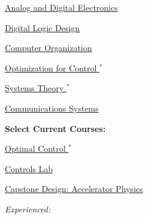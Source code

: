 \documentclass[10pt,a4paper,ragged2e,withhyper]{altacv}
\begin{document}
\begin{paracol}{2}
\begin{multicols}{2}
    \columnbreak
    
    \vspace{0.75cm}
    
    \begin{tightemize}
        \item \href{https://ece.umd.edu/course-schedule/course/ENEE303}{Analog and Digital Electronics}
        \item \href{https://ece.umd.edu/course-schedule/course/ENEE244}{Digital Logic Design}
        \item \href{https://ece.umd.edu/course-schedule/course/ENEE350}{Computer Organization}
        \item \href{https://ece.umd.edu/course-schedule/course/ENEE469O}{Optimization for Control $^*$}
        \item \href{https://ece.umd.edu/course-schedule/course/ENEE660}{Systems Theory $^*$}
        \item \href{https://ece.umd.edu/course-schedule/course/ENEE420}{Communications Systems}
    \end{tightemize}
    
    \vspace{0.375cm}
    
    \textbf{Select Current Courses:}
    \vspace{0.375cm}
    \begin{tightemize}
        \item \href{https://ece.umd.edu/course-schedule/course/ENEE664}{Optimal Control  $^*$}
        \item \href{https://ece.umd.edu/course-schedule/course/ENEE461}{Controls Lab}
        \item \href{https://ece.umd.edu/course-schedule/course/ENEE408T}{Capstone Design: Accelerator Physics}
    \end{tightemize}
\end{multicols}

\vspace{-0.25cm}


\textit{Experienced:}

\vspace{0.125cm}


\end{paracol}
\end{document}
